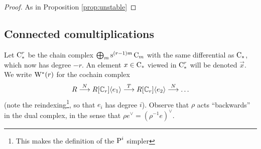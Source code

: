 \begin{proof}
	As in Proposition \ref{prop:unstable}
\end{proof}

\subsection{Connected comultiplications}

Let $\operatorname{C}_*^r$ be the chain complex $\bigoplus_m \operatorname{s}^{(r-1)m}\operatorname{C}_m$ with the same differential as $\operatorname{C}_*$, which now has degree $-r$. An element $x\in \operatorname{C}_*$ viewed in $\operatorname{C}_*^r$ will be denoted $\vec{x}$. We write $\mathrm{W}^*(r)$ for the cochain complex
\[
R\overset{N}{\longrightarrow} R[\mathbb{C}_r]\langle e_1\rangle \overset{T}{\longrightarrow} R[\mathbb{C}_r]\langle e_2\rangle \overset{N}{\longrightarrow} \ldots
\]
(note the reindexing\footnote{This makes the definition of the $\operatorname{P}^i$ simpler}, so that $e_i$ has degree $i$). Observe that $\rho$ acts ``backwards'' in the dual complex, in the sense that $\rho e^\vee = (\rho^{-1} e)^{\vee}$.


